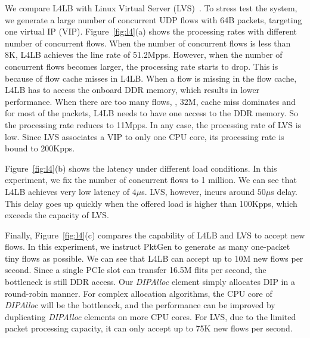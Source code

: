  We compare L4LB with Linux Virtual Server (LVS)~\cite{lvs}.
To stress test the system, we generate a large number of concurrent UDP flows with 64B packets, targeting one virtual IP (VIP).
Figure~\ref{fig:l4}(a) shows the processing rates with different number of concurrent flows.
When the number of concurrent flows is less than 8K, L4LB achieves the line rate of 51.2Mpps.
However, when the number of concurrent flows becomes larger, the processing rate starts to drop.
This is because of flow cache misses in L4LB. 
When a flow is missing in the flow cache,  L4LB has to access the onboard DDR memory,
which results in lower performance.
When there are too many flows, \eg, 32M, cache miss dominates and for most of the packets, 
L4LB needs to have one access to the DDR memory. So the processing rate reduces to 11Mpps.
In any case, the processing rate of LVS is low.  
Since LVS associates a VIP to only one CPU core, its processing rate is bound to 200Kpps.

Figure~\ref{fig:l4}(b) shows the latency under different load conditions. 
In this experiment, we fix the number of concurrent flows to 1 million. 
We can see that L4LB achieves very low latency of $4\mu$s.
LVS, however, incurs around $50\mu$s delay.
This delay goes up quickly when the offered load is higher than 100Kpps, which exceeds the  capacity of LVS. 

Finally, Figure~\ref{fig:l4}(c) compares the capability of L4LB and LVS to accept new flows. 
In this experiment, we instruct PktGen to generate as many one-packet tiny flows as possible.
We can see that L4LB can accept up to 10M new flows per second.
%
Since a single PCIe slot can transfer 16.5M flits per second, the bottleneck is still DDR access.
%
Our \textit{DIPAlloc} element simply allocates DIP in a round-robin manner.
For complex allocation algorithms, the CPU core of \textit{DIPAlloc} will be the bottleneck, and the performance can be improved by duplicating \textit{DIPAlloc} elements on more CPU cores.
For LVS, due to the limited packet processing capacity, it can only accept up to 75K new flows per second.

